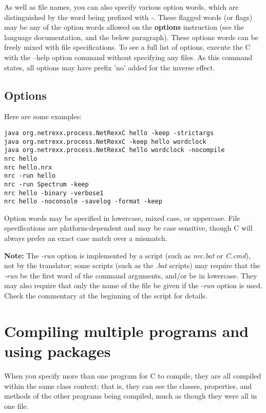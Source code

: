 As well as file names, you can also specify various option words, which
are distinguished by the word being prefixed with \emph{-}.  These
flagged words (or flags) may be any of the option words allowed
on the \nr{} \textbf{options} instruction (see the \nr{} language documentation, and the below paragraph).  These options words can be freely mixed with file
specifications.  To see a full list of options, execute the \nr{}C with the --help option
command without specifying any files. As this command states, all options may have prefix 'no' added for the inverse effect.

\subsection{Options}

Here are some examples:
\begin{lstlisting}
java org.netrexx.process.NetRexxC hello -keep -strictargs
java org.netrexx.process.NetRexxC -keep hello wordclock
java org.netrexx.process.NetRexxC hello wordclock -nocompile
nrc hello
nrc hello.nrx
nrc -run hello
nrc -run Spectrum -keep
nrc hello -binary -verbose1
nrc hello -noconsole -savelog -format -keep
\end{lstlisting}

Option words may be specified in lowercase, mixed case, or uppercase.
File specifications are platform-dependent and may be case sensitive,
though \nr{}C will always prefer an exact case match over a mismatch.

\textbf{Note:} The \emph{-run} option is implemented by a script (such
as \emph{nrc.bat} or \emph{\nr{}C.cmd}), not by the translator; some
scripts (such as the \emph{.bat} scripts) may require that
the \emph{-run} be the first word of the command arguments, and/or be in
lowercase.  They may also require that only the name of the file be
given if the \emph{-run} option is used.  Check the commentary at the
beginning of the script for details.

\section{Compiling multiple programs and using packages}

When you specify more than one program for \nr{}C to compile, they are
all compiled within the same class context: that is, they can see
the classes, properties, and methods of the other programs being
compiled, much as though they were all in one file.

